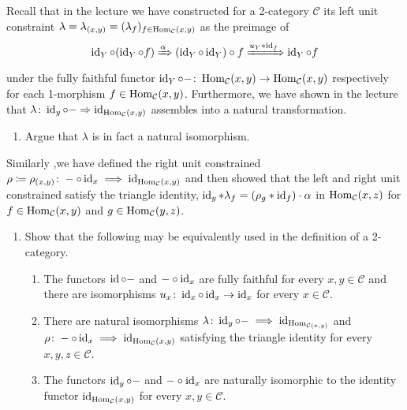 \begin{Exercise}
	Recall that in the lecture we have constructed for a 2-category $ \mathcal{ C } $ its left unit constraint $ \lambda = \lambda_{ ( x ,y ) } = ( \lambda_f )_{ f \in \operatorname{Hom}_{ \mathcal{ C } } ( x , y ) } $ as the preimage of 
	\[
	\operatorname{id}_Y \circ ( \operatorname{id}_Y \circ f ) 
	\xRightarrow{ \alpha }
	( \operatorname{id}_Y \circ \operatorname{id}_Y ) \circ f 
	\xRightarrow{ u_Y * \operatorname{id}_f } 
	\operatorname{id}_Y \circ f
	\]
	under the fully faithful functor $ \operatorname{id}_Y \circ - \colon \operatorname{Hom}_{ \mathcal{ C } } ( x , y ) \to \operatorname{Hom}_{ \mathcal{ C } } ( x , y ) $ respectively for each 1-morphism $ f \in \operatorname{Hom}_{ \mathcal{ C } } ( x , y ) $.
	Furthermore, we have shown in the lecture that $ \lambda \colon \operatorname{id}_y \circ - \Rightarrow \operatorname{id}_{ \operatorname{Hom}_{ \mathcal{ C } } ( x ,y ) }$ assembles into a natural transformation.
	
	\begin{enumerate}[label=(\alph*)]
		\item 
		Argue that $ \lambda $ is in fact a natural isomorphism.
	\end{enumerate}
	
	Similarly ,we have defined the right unit constrained $ \rho \coloneqq \rho_ { ( x , y ) } \colon - \circ \operatorname{id}_x \implies \operatorname{id}_{ \operatorname{Hom}_{ \mathcal{ C } } ( x ,y ) } $ and then showed that the left and right unit constrained satisfy the triangle identity, $ \operatorname{id}_y * \lambda_f = ( \rho_g * \operatorname{id}_f ) \cdot \alpha $ in $ \operatorname{Hom}_{ \mathcal{ C } } ( x , z ) $ for $ f \in \operatorname{Hom}_{ \mathcal{ C } } ( x , y ) $ and $ g \in \operatorname{Hom}_{ \mathcal{ C } } ( y , z ) $.
	
	\begin{enumerate}[resume, label=(\alph*)]
		\item 
		Show that the following may be equivalently used in the definition of a 2-category.
		\begin{enumerate}[label=(\arabic*)]
			\item 
			The functors $ \operatorname{id} \circ -$ and $ - \circ \operatorname{id}_x $ are fully faithful for every $ x , y \in \mathcal{ C } $ and there are isomorphisms $ u_x \colon \operatorname{id}_x \circ \operatorname{id}_x \to \operatorname{id}_x $ for every $x \in \mathcal{ C } $.
			
			\item 
			There are natural isomorphisms $ \lambda \colon \operatorname{id}_y \circ - \implies \operatorname{id}_{ \operatorname{Hom}_{ \mathcal{ C } ( x , y ) } } $ and $ \rho \colon - \circ \operatorname{id}_x \implies \operatorname{id}_{ \operatorname{Hom}_{ \mathcal{ C } } ( x ,y ) } $ satisfying the triangle identity for every $ x , y , z  \in \mathcal{ C } $.
			
			\item 
			The functors $ \operatorname{id}_y \circ - $ and $ - \circ \operatorname{id}_x $ are naturally isomorphic to the identity functor $ \operatorname{id}_{ \operatorname{Hom}_{ \mathcal{ C } } ( x , y ) }$ for every $ x , y \in \mathcal{ C } $.
			

\end{enumerate}
\end{enumerate}
\end{Exercise}
